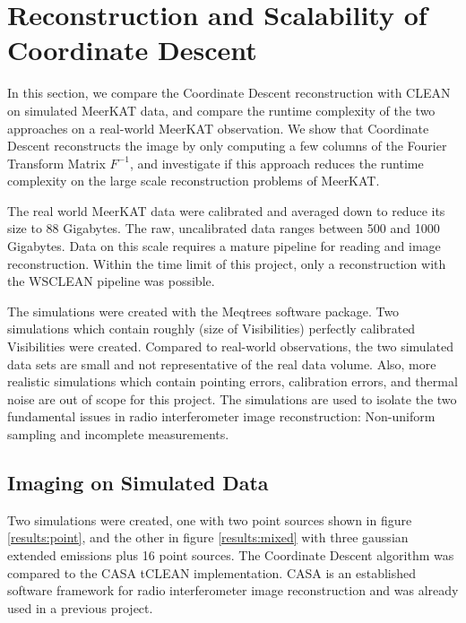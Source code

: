 \section{Reconstruction and Scalability of Coordinate Descent}
In this section, we compare the Coordinate Descent reconstruction with CLEAN on simulated MeerKAT data, and compare the runtime complexity of the two approaches on a real-world MeerKAT observation. We show that Coordinate Descent reconstructs the image by only computing a few columns of the Fourier Transform Matrix $F^{-1}$, and investigate if this approach reduces the runtime complexity on the large scale reconstruction problems of MeerKAT.

The real world MeerKAT data were calibrated and averaged down to reduce its size to 88 Gigabytes. The raw, uncalibrated data ranges between 500 and 1000 Gigabytes. Data on this scale requires a mature pipeline for reading and image reconstruction. Within the time limit of this project, only a reconstruction with the WSCLEAN\cite{offringa2014wsclean} pipeline was possible.

The simulations were created with the Meqtrees software package. Two simulations which contain roughly (size of Visibilities) perfectly calibrated Visibilities were created. Compared to real-world observations, the two simulated data sets are small and not representative of the real data volume. Also, more realistic simulations which contain pointing errors, calibration errors, and thermal noise are out of scope for this project. The simulations are used to isolate the two fundamental issues in radio interferometer image reconstruction: Non-uniform sampling and incomplete measurements.

\subsection{Imaging on Simulated Data}
Two simulations were created, one with two point sources shown in figure \ref{results:point}, and the other in figure \ref{results:mixed} with three gaussian extended emissions plus 16 point sources. The Coordinate Descent algorithm was compared to the CASA tCLEAN implementation. CASA is an established software framework for radio interferometer image reconstruction and was already used in a previous project.

